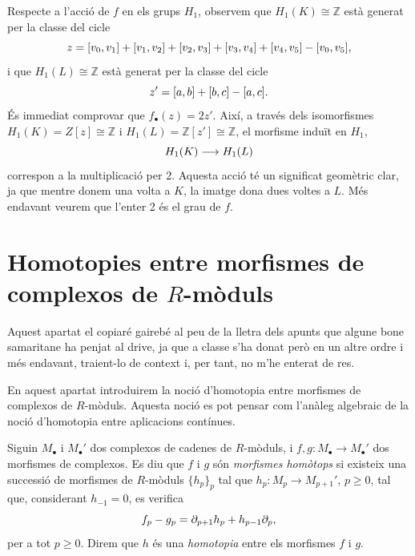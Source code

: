 \documentclass[../main.tex]{subfiles}
\begin{document}
Respecte a l'acció de $f$ en els grups $H_1$, observem que $H_1(K)\cong\mathbb{Z}$ està generat per la classe del cicle
\begin{equation}
    \notag
    z = [v_0,v_1]+[v_1,v_2]+[v_2,v_3]+[v_3,v_4]+[v_4,v_5]-[v_0,v_5],
\end{equation}
i que $H_1(L)\cong\mathbb{Z}$ està generat per la classe del cicle
\begin{equation}
    \notag
    z' = [a,b]+[b,c]-[a,c].
\end{equation}
És immediat comprovar que $f_\bullet(z) = 2z'$. Així, a través dels isomorfismes $H_1(K) = Z[z]\cong\mathbb{Z}$ i $H_1(L) = \mathbb{Z}[z']\cong \mathbb{Z}$, el morfisme induït en $H_1$,
\begin{equation}
    \notag
    H_1(K)\longrightarrow H_1(L)
\end{equation}
correspon a la multiplicació per 2. Aquesta acció té un significat geomètric clar, ja que mentre donem una volta a $K$, la imatge dona dues voltes a $L$. Més endavant veurem que l'enter 2 és el grau de $f$.










\section{Homotopies entre morfismes de complexos de \texorpdfstring{$R$}{TEXT}-mòduls}

Aquest apartat el copiaré gairebé al peu de la lletra dels apunts que algune bone samaritane ha penjat al drive, ja que a classe s'ha donat però en un altre ordre i més endavant, traient-lo de context i, per tant, no m'he enterat de res. 

En aquest apartat introduirem la noció d'homotopia entre morfismes de complexos de $R$-mòduls. Aquesta noció es pot pensar com l'anàleg algebraic de la noció d'homotopia entre aplicacions contínues.

\begin{defi}
Siguin $M_\bullet$ i $M_\bullet'$ dos complexos de cadenes de $R$-mòduls, i $f,g:M_\bullet\rightarrow M_\bullet'$ dos morfismes de complexos. Es diu que $f$ i $g$ són \textit{morfismes homòtops} si existeix una successió de morfismes de $R$-mòduls $\{h_p\}_p$ tal que $h_p:M_p\rightarrow M_{p+1}'$, $p\geq 0$, tal que, considerant $h_{-1} = 0$, es verifica   
\begin{equation}
    \notag
    f_p-g_p = \partial_{p+1}h_p+h_{p-1}\partial_p,
\end{equation}
per a tot $p\geq0$. Direm que $h$ és una \textit{homotopia} entre els morfismes $f$ i $g$.
\end{defi}
\end{document}
